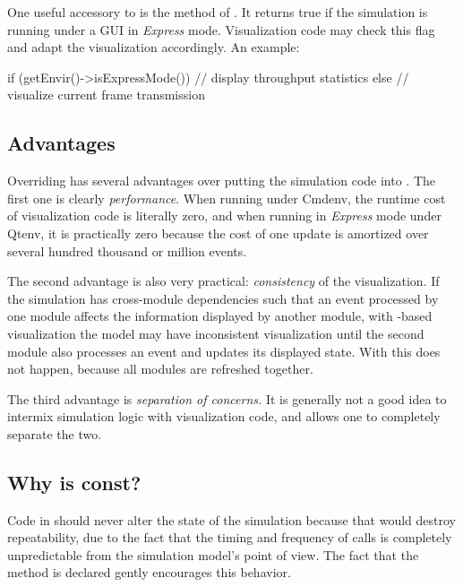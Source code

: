 One useful accessory to  is the
 method of . It returns true if the
simulation is running under a GUI in \textit{Express} mode. Visualization
code may check this flag and adapt the visualization accordingly. An example:

\begin{cpp}
if (getEnvir()->isExpressMode()) {
    // display throughput statistics
}
else {
    // visualize current frame transmission
}
\end{cpp}


\subsection{Advantages}
\label{sec:graphics:refreshdisplay-advantages}

Overriding  has several advantages over putting the
simulation code into . The first one is clearly
\textit{performance}. When running under Cmdenv,
the runtime cost of visualization code is literally zero, and when running
in \textit{Express} mode under Qtenv, it is practically zero because
the cost of one update is amortized over several hundred thousand or
million events.

The second advantage is also very practical: \textit{consistency} of the
visualization. If the simulation has cross-module dependencies such that
an event processed by one module affects the information displayed
by another module, with -based visualization
the model may have inconsistent visualization until the second module
also processes an event and updates its displayed state. With
 this does not happen, because all modules
are refreshed together.

The third advantage is \textit{separation of concerns.} It is generally
not a good idea to intermix simulation logic with visualization code,
and  allows one to completely separate the two.


\subsection{Why is  const?}
\label{sec:graphics:refreshdisplay-constness}

Code in  should never alter the state of the
simulation because that would destroy repeatability, due to the
fact that the timing and frequency of 
calls is completely unpredictable from the simulation model's point of view.
The fact that the method is declared  gently encourages this behavior.

